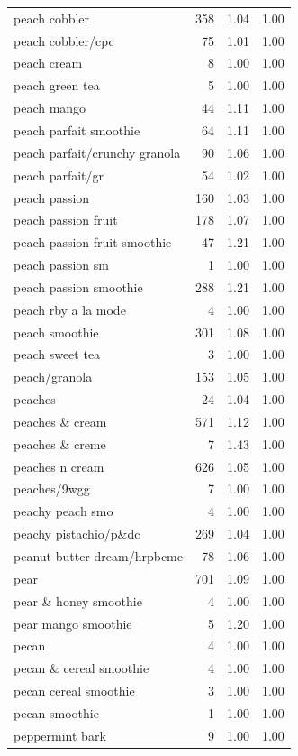 \begin{table}
\begin{tabular}{lrrr}
peach cobbler & 358 & 1.04 & 1.00 \\
peach cobbler/cpc & 75 & 1.01 & 1.00 \\
peach cream & 8 & 1.00 & 1.00 \\
peach green tea & 5 & 1.00 & 1.00 \\
peach mango & 44 & 1.11 & 1.00 \\
peach parfait smoothie & 64 & 1.11 & 1.00 \\
peach parfait/crunchy granola & 90 & 1.06 & 1.00 \\
peach parfait/gr & 54 & 1.02 & 1.00 \\
peach passion & 160 & 1.03 & 1.00 \\
peach passion fruit & 178 & 1.07 & 1.00 \\
peach passion fruit smoothie & 47 & 1.21 & 1.00 \\
peach passion sm & 1 & 1.00 & 1.00 \\
peach passion smoothie & 288 & 1.21 & 1.00 \\
peach rby a la mode & 4 & 1.00 & 1.00 \\
peach smoothie & 301 & 1.08 & 1.00 \\
peach sweet tea & 3 & 1.00 & 1.00 \\
peach/granola & 153 & 1.05 & 1.00 \\
peaches & 24 & 1.04 & 1.00 \\
peaches \& cream & 571 & 1.12 & 1.00 \\
peaches \& creme & 7 & 1.43 & 1.00 \\
peaches n cream & 626 & 1.05 & 1.00 \\
peaches/9wgg & 7 & 1.00 & 1.00 \\
peachy peach smo & 4 & 1.00 & 1.00 \\
peachy pistachio/p\&dc & 269 & 1.04 & 1.00 \\
peanut butter dream/hrpbcmc & 78 & 1.06 & 1.00 \\
pear & 701 & 1.09 & 1.00 \\
pear \& honey smoothie & 4 & 1.00 & 1.00 \\
pear mango smoothie & 5 & 1.20 & 1.00 \\
pecan & 4 & 1.00 & 1.00 \\
pecan \& cereal smoothie & 4 & 1.00 & 1.00 \\
pecan cereal smoothie & 3 & 1.00 & 1.00 \\
pecan smoothie & 1 & 1.00 & 1.00 \\
peppermint bark & 9 & 1.00 & 1.00 \\

\end{tabular}
\end{table}

